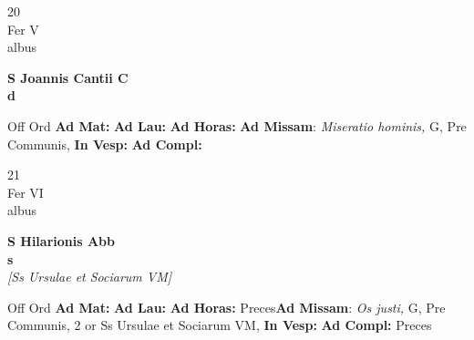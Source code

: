 \documentclass[10pt, openany]{book}
\begin{document}
        \begin{center}
            \begin{minipage}{3.5in}
                \vspace{2em}
                \begin{minipage}{0.5in}
                    {\Huge 20} \\
                    {\normalsize Fer V} \\
                    {\normalsize albus}
                \end{minipage}
                \begin{minipage}{3.0in}
                    \textbf{ \large S Joannis Cantii C \\
                    \textnormal{\normalsize d}} \\ 
                \end{minipage}
                \begin{justify}Off Ord
                    \textbf{Ad Mat: }
                    \textbf{Ad Lau: }
                    \textbf{Ad Horas: }\textbf{Ad Missam}: \textit{Miseratio hominis,} G, Pre Communis,  
                    \textbf{In Vesp: }
                    \textbf{Ad Compl: }
                \end{justify}
            \end{minipage}
        \end{center}
    
        \begin{center}
            \begin{minipage}{3.5in}
                \vspace{2em}
                \begin{minipage}{0.5in}
                    {\Huge 21} \\
                    {\normalsize Fer VI} \\
                    {\normalsize albus}
                \end{minipage}
                \begin{minipage}{3.0in}
                    \textbf{ \large S Hilarionis Abb \\
                    \textnormal{\normalsize s}} \\ \textit{[Ss Ursulae et Sociarum VM]} \\ 
                \end{minipage}
                \begin{justify}Off Ord
                    \textbf{Ad Mat: }
                    \textbf{Ad Lau: }
                    \textbf{Ad Horas: }Preces\textbf{Ad Missam}: \textit{Os justi,} G, Pre Communis, 2 or Ss Ursulae et Sociarum VM,  
                    \textbf{In Vesp: }
                    \textbf{Ad Compl: }Preces
                \end{justify}
            \end{minipage}
        \end{center}
    
\end{document}
